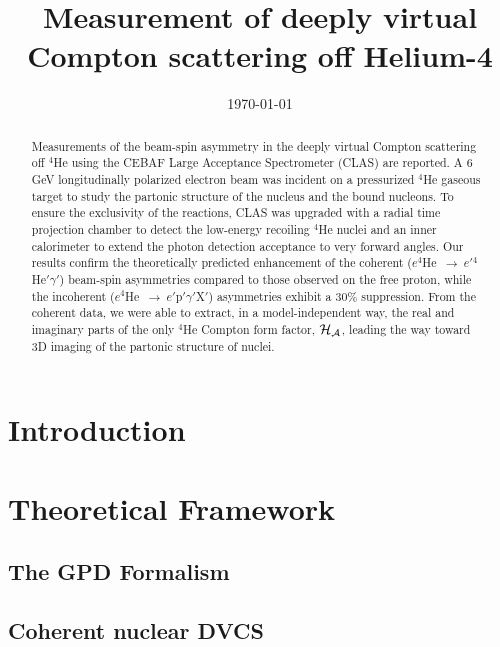 \documentclass[aps,prc,preprint,superscriptaddress]{revtex4}
\begin{document}
\title{Measurement of deeply virtual Compton scattering off Helium-4}



\date{\today}

\begin{abstract}
Measurements of the beam-spin asymmetry in the deeply virtual Compton 
scattering off $^4$He using the CEBAF Large Acceptance Spectrometer (CLAS) are 
reported. A 6 GeV longitudinally polarized electron beam was incident on a 
pressurized $^4$He gaseous target to study the partonic structure of the 
nucleus and the bound nucleons. To ensure the exclusivity of the reactions, 
CLAS was upgraded with a radial time projection chamber to detect the 
low-energy recoiling $^4$He nuclei and an inner calorimeter to extend the 
photon detection acceptance to very forward angles. Our results confirm the 
theoretically predicted enhancement of the coherent 
($e^4$He~$\to~e'$$^4$He$'\gamma'$) beam-spin asymmetries compared to those 
observed on the free proton, while the incoherent 
($e^4$He~$\to~e'$p$'\gamma'$X$'$) asymmetries exhibit a 30$\%$ suppression.  
From the coherent data, we were able to extract, in a model-independent way, 
the real and imaginary parts of the only $^4$He Compton form factor, $\cal 
H_A$, leading the way toward 3D imaging of the partonic structure of nuclei.
\end{abstract}

\pacs{}

\maketitle

\section{Introduction}

\section{Theoretical Framework}

\subsection{The GPD Formalism}

\subsection{Coherent nuclear DVCS}
\end{document}
